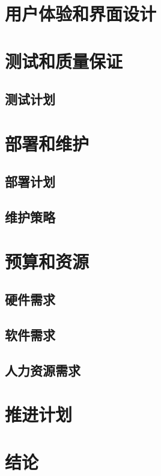 \documentclass{article}
\begin{document}
\section{用户体验和界面设计}
\section{测试和质量保证}
\subsection{测试计划}
\section{部署和维护}
\subsection{部署计划}
\subsection{维护策略}
\section{预算和资源}
\subsection{硬件需求}
\subsection{软件需求}
\subsection{人力资源需求}
\section{推进计划}
\section{结论}
\end{document}
